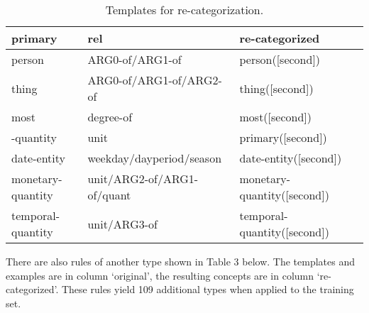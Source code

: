 \documentclass[11pt,a4paper]{article}
\begin{document}
\begin{table*}[t!] \small 
    \begin{center} 
        \begin{tabular}{llll} 
            \hline  primary &  rel    &  re-categorized \\  \hline
            person &  ARG0-of/ARG1-of & person([second])\\
            thing &  ARG0-of/ARG1-of/ARG2-of & thing([second])\\
            most & degree-of &   most([second])\\
            -quantity & unit  &    primary([second])\\
            date-entity & weekday/dayperiod/season  &   date-entity([second])\\
            monetary-quantity & unit/ARG2-of/ARG1-of/quant  &   monetary-quantity([second])\\
            temporal-quantity & unit/ARG3-of  &    temporal-quantity([second])\\
            \hline
        \end{tabular}
    \end{center}
	\caption{\label{table:templates} Templates for re-categorization.}
\end{table*}

There are also rules of another type shown in Table 3 below. The templates and examples are in column `original', the resulting concepts are in column `re-categorized'. These rules yield 109 additional types when applied to the training set.
\end{document}
